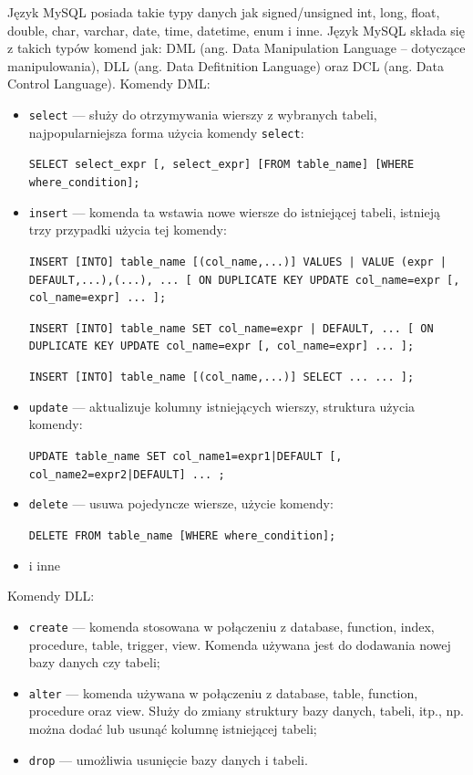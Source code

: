 \documentclass[eng,printmode,oneside]{mgr}
\begin{document}
Język MySQL posiada takie typy danych jak signed/unsigned int, long, float,
double, char, varchar, date, time, datetime, enum i inne. Język MySQL składa się
z takich typów komend jak: DML (ang.
Data Manipulation Language -- dotyczące manipulowania), DLL (ang. Data
Defitnition Language) oraz DCL (ang. Data Control Language).
Komendy DML:
\begin{itemize}
  \item \texttt{select} --- służy do otrzymywania wierszy z wybranych tabeli,
  najpopularniejsza forma użycia komendy \texttt{select}:
    
  \texttt{SELECT select\_expr [, select\_expr] [FROM table\_name] [WHERE
  where\_condition];}
  
  \item \texttt{insert} --- komenda ta wstawia nowe wiersze do istniejącej tabeli,
  istnieją trzy przypadki użycia tej komendy:
  
  \texttt{INSERT [INTO] table\_name [(col\_name,...)]
    {VALUES | VALUE} ({expr | DEFAULT},...),\newline (...), ...
    [ ON DUPLICATE KEY UPDATE
      col\_name=expr
        [, col\_name=expr] ... ];} 
  
  \texttt{INSERT [INTO] table\_name SET col\_name={expr | DEFAULT}, ... [ ON
  DUPLICATE KEY \newline UPDATE col\_name=expr [, col\_name=expr] ... ];}
      
   \texttt{INSERT [INTO] table\_name [(col\_name,...)]
    SELECT ... \newline[ ON DUPLICATE KEY UPDATE
      col\_name=expr
        [, col\_name=expr] ... ];}
  
  \item \texttt{update} --- aktualizuje kolumny istniejących wierszy,
  struktura użycia komendy:
  
  \texttt{UPDATE table\_name
    SET col\_name1={expr1|DEFAULT} [, col\_name2={expr2|DEFAULT}] ...
    ;}
  
  \item \texttt{delete} --- usuwa pojedyncze wiersze, użycie komendy:
  
  \texttt{DELETE FROM table\_name [WHERE where\_condition];}
  
  \item i inne
\end{itemize}
Komendy DLL:
\begin{itemize}
  \item \texttt{create} --- komenda stosowana w połączeniu z database, function,
  index, procedure, table, trigger, view. Komenda używana jest do
  dodawania nowej bazy danych czy tabeli;
  \item \texttt{alter} --- komenda używana w połączeniu z database, table,
  function, procedure oraz view. Służy do zmiany struktury bazy danych, tabeli,
  itp., np. można dodać lub usunąć kolumnę istniejącej tabeli;
  \item \texttt{drop} --- umożliwia usunięcie bazy danych i tabeli.
\end{itemize}
\end{document}

